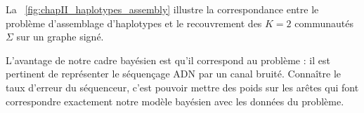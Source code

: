 La \Fig~\ref{fig:chapII_haplotypes_assembly} illustre la correspondance entre le problème d'assemblage d'haplotypes et le recouvrement des $K=2$ communautés $\Sigma$ sur un graphe signé.

L'avantage de notre cadre bayésien est qu'il correspond au problème : il est pertinent de représenter le séquençage ADN par un canal bruité. Connaître le taux d'erreur du séquenceur, c'est pouvoir mettre des poids sur les arêtes qui font correspondre exactement notre modèle bayésien avec les données du problème.



